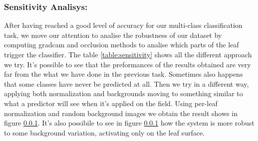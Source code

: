 \subsubsection{Sensitivity Analisys:}
After having reached a good level of accuracy for our multi-class classification task, we move our attention to analise the robustness of our dataset by computing gradcam and occlusion methods to analise which parts of the leaf trigger the classifier. The table \ref{table:sensitivity} shows all the different approach we try. It's possible to see that the preformances of the results obtained are very far from the what we have done in the previous task. Sometimes also happens that some classes have never be predicted at all. Then we try in a different way, applying both normalization and backgrounds moving to something similar to what a predictor will see when it's applied on the field. Using per-leaf normalization and random background images we obtain the result shows in figure \ref{}. It's also possibile to see in figure \ref{} how the system is more robust to some background variation, activating only on the leaf surface.
